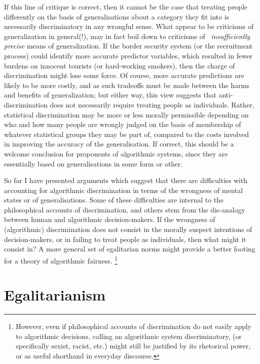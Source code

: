 \documentclass[pmlr,twocolumn,10pt]{jmlr}%
\begin{document}
If this line of critique is correct, then it cannot be the case that treating people differently on the basis of generalisations about a category they fit into is necessarily discriminatory in any wrongful sense. What appear to be criticisms of generalization in general(!), may in fact boil down to criticisms of ~\emph{insufficiently precise} means of generalization. If the border security system (or the recruitment process) could identify more accurate predictor variables, which resulted in fewer burdens on innocent tourists (or hard-working smokers), then the charge of discrimination might lose some force. Of course, more accurate predictions are likely to be more costly, and as such tradeoffs must be made between the harms and benefits of generalization; but either way, this view suggests that anti-discrimination does not necessarily require treating people as individuals. Rather, statistical discrimination may be more or less morally permissible depending on who and how many people are wrongly judged on the basis of membership of whatever statistical groups they may be part of, compared to the costs involved in improving the accuracy of the generalisation. If correct, this should be a welcome conclusion for proponents of algorithmic systems, since they are essentially based on generalisations in some form or other.

So far I have presented arguments which suggest that there are difficulties with accounting for algorithmic discrimination in terms of the wrongness of mental states or of generalisations. Some of these difficulties are internal to the philosophical accounts of discrimination, and others stem from the dis-analogy between human and algorithmic decision-makers. If the wrongness of (algorithmic) discrimination does not consist in the morally suspect intentions of decision-makers, or in failing to treat people as individuals, then what might it consist in? A more general set of egalitarian norms might provide a better footing for a theory of algorithmic fairness. \footnote{However, even if philosophical accounts of discrimination do not easily apply to algorithmic decisions, calling an algorithmic system  discriminatory, (or specifically sexist, racist, etc.) might still be justified by its rhetorical power, or as useful shorthand in everyday discourse.}

\section{Egalitarianism}
\end{document}
